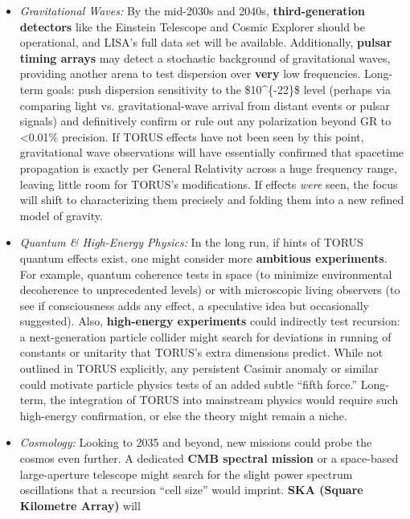 \begin{itemize}
  \begin{itemize}
  \item
    \emph{Gravitational Waves:} By the mid-2030s and 2040s,
    \textbf{third-generation detectors} like the Einstein Telescope and
    Cosmic Explorer should be operational, and LISA's full data set will
    be available. Additionally, \textbf{pulsar timing arrays} may detect
    a stochastic background of gravitational waves, providing another
    arena to test dispersion over \textbf{very} low frequencies.
    Long-term goals: push dispersion sensitivity to the
    \$10\^{}\{-22\}\$ level (perhaps via comparing light vs.
    gravitational-wave arrival from distant events or pulsar signals)
    and definitively confirm or rule out any polarization beyond GR to
    \textless{}0.01\% precision. If TORUS effects have not been seen by
    this point, gravitational wave observations will have essentially
    confirmed that spacetime propagation is exactly per General
    Relativity across a huge frequency range, leaving little room for
    TORUS's modifications. If effects \emph{were} seen, the focus will
    shift to characterizing them precisely and folding them into a new
    refined model of gravity.
  \item
    \emph{Quantum \& High-Energy Physics:} In the long run, if hints of
    TORUS quantum effects exist, one might consider more
    \textbf{ambitious experiments}. For example, quantum coherence tests
    in space (to minimize environmental decoherence to unprecedented
    levels) or with microscopic living observers (to see if
    consciousness adds any effect, a speculative idea but occasionally
    suggested). Also, \textbf{high-energy experiments} could indirectly
    test recursion: a next-generation particle collider might search for
    deviations in running of constants or unitarity that TORUS's extra
    dimensions predict. While not outlined in TORUS explicitly, any
    persistent Casimir anomaly or similar could motivate particle
    physics tests of an added subtle ``fifth force.'' Long-term, the
    integration of TORUS into mainstream physics would require such
    high-energy confirmation, or else the theory might remain a niche.
  \item
    \emph{Cosmology:} Looking to 2035 and beyond, new missions could
    probe the cosmos even further. A dedicated \textbf{CMB spectral
    mission} or a space-based large-aperture telescope might search for
    the slight power spectrum oscillations that a recursion ``cell
    size'' would imprint​. \textbf{SKA (Square Kilometre Array)} will

\end{itemize}
\end{itemize}
